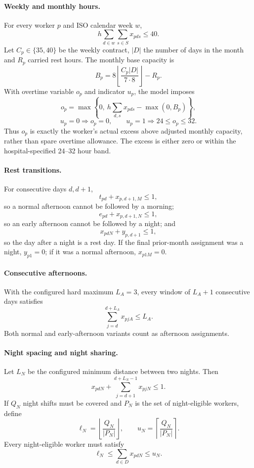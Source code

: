 \documentclass[11pt,a4paper]{article}
\begin{document}
\paragraph{Weekly and monthly hours.}
For every worker $p$ and ISO calendar week $w$,
\[
 h\sum_{d\in w}\sum_{s\in S}x_{pds}\leq40.
\]
Let $C_p\in\{35,40\}$ be the weekly contract, $|D|$ the number of days in the month and $R_p$ carried rest hours. The monthly base capacity is
\[
 B_p=8\left\lfloor\frac{C_p|D|}{7\cdot8}\right\rfloor-R_p.
\]
With overtime variable $o_p$ and indicator $u_p$, the model imposes
\[
 o_p=\max\left\{0,\ h\sum_{d,s}x_{pds}-\max(0,B_p)\right\},
\]
\[
 u_p=0\Rightarrow o_p=0,\qquad
 u_p=1\Rightarrow24\leq o_p\leq32.
\]
Thus $o_p$ is exactly the worker's actual excess above adjusted monthly capacity, rather than spare overtime allowance. The excess is either zero or within the hospital-specified 24--32 hour band.

\paragraph{Rest transitions.}
For consecutive days $d,d+1$,
\[
 t_{pd}+x_{p,d+1,M}\leq1,
\]
so a normal afternoon cannot be followed by a morning;
\[
 e_{pd}+x_{p,d+1,N}\leq1,
\]
so an early afternoon cannot be followed by a night; and
\[
 x_{pdN}+y_{p,d+1}\leq1,
\]
so the day after a night is a rest day. If the final prior-month assignment was a night, $y_{p1}=0$; if it was a normal afternoon, $x_{p1M}=0$.

\paragraph{Consecutive afternoons.}
With the configured hard maximum $L_A=3$, every window of $L_A+1$ consecutive days satisfies
\[
 \sum_{j=d}^{d+L_A}x_{pjA}\leq L_A.
\]
Both normal and early-afternoon variants count as afternoon assignments.

\paragraph{Night spacing and night sharing.}
Let $L_N$ be the configured minimum distance between two nights. Then
\[
 x_{pdN}+\sum_{j=d+1}^{d+L_N-1}x_{pjN}\leq1.
\]
If $Q_N$ night shifts must be covered and $P_N$ is the set of night-eligible workers, define
\[
 \ell_N=\left\lfloor\frac{Q_N}{|P_N|}\right\rfloor,
 \qquad
 u_N=\left\lceil\frac{Q_N}{|P_N|}\right\rceil.
\]
Every night-eligible worker must satisfy
\[
 \ell_N\leq\sum_{d\in D}x_{pdN}\leq u_N.
\]
\end{document}
